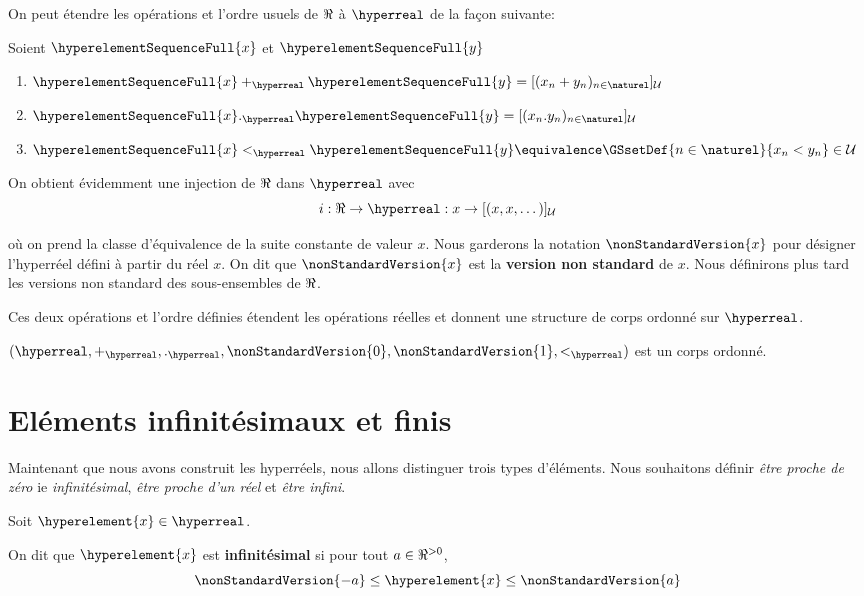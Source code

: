 On peut étendre les opérations et l'ordre usuels de $\real$ à $\hyperreal$ de la façon
suivante:

Soient $\hyperelementSequenceFull{x}$ et $\hyperelementSequenceFull{y}$
\begin{enumerate}
	\item $\hyperelementSequenceFull{x} +_{\hyperreal} \hyperelementSequenceFull{y} = [(x_{n} +
		y_{n})_{n \in \naturel}]_{\mathcal{U}}$
	\item $\hyperelementSequenceFull{x} ._{\hyperreal} \hyperelementSequenceFull{y} = [(x_{n} .
		y_{n})_{n \in \naturel}]_{\mathcal{U}}$
	\item $\hyperelementSequenceFull{x} <_{\hyperreal} \hyperelementSequenceFull{y} \equivalence
		\GSsetDef{n \in \naturel}{x_{n} < y_{n}} \in \mathcal{U}$
\end{enumerate}

On obtient évidemment une injection de $\real$ dans $\hyperreal$ avec
\begin{equation}
	i : \real \rightarrow \hyperreal : x \rightarrow [(x, x, \dots)]_{\mathcal{U}}
\end{equation}

où on prend la classe d'équivalence de la suite constante de valeur $x$. Nous
garderons la notation $\nonStandardVersion{x}$ pour désigner l'hyperréel défini
à partir du réel $x$. On dit que $\nonStandardVersion{x}$ est la \textbf{version
non standard} de $x$. Nous définirons plus tard les versions non standard des
sous-ensembles de $\real$.

Ces deux opérations et l'ordre définies étendent les opérations réelles et
donnent une structure de corps ordonné sur $\hyperreal$.

\begin{proposition}
	$(\hyperreal, +_{\hyperreal}, ._{\hyperreal}, \nonStandardVersion{0},
	\nonStandardVersion{1},
<_{\hyperreal})$ est un corps ordonné.
\end{proposition}

\section{Eléments infinitésimaux et finis}

Maintenant que nous avons construit les hyperréels, nous allons distinguer trois
types d'éléments. Nous souhaitons définir \textit{être proche de zéro} ie
\textit{infinitésimal}, \textit{être proche d'un réel} et \textit{être infini}.

\begin{definition} [Infinitésimal]
	Soit $\hyperelement{x} \in \hyperreal$.

	On dit que $\hyperelement{x}$ est \textbf{infinitésimal} si pour tout $a \in
	\real^{> 0}$,
	\begin{equation}
		\nonStandardVersion{-a} \leq \hyperelement{x} \leq \nonStandardVersion{a}
	\end{equation}
\end{definition}

